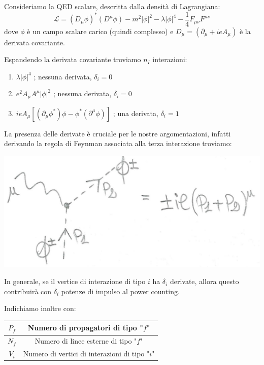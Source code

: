 \documentclass[../main.tex]{subfiles}
\begin{document}
\begin{example}
    Consideriamo la QED scalare, descritta dalla densità di Lagrangiana:
    \[
    \mathscr{L} = (D_\mu\phi)^*(D^\mu\phi)-m^2|\phi|^2-\lambda|\phi|^4-\frac{1}{4}F_{\mu\nu}F^{\mu\nu}
    \]
    dove $\phi$ è un campo scalare carico (quindi complesso) e $D_\mu = (\partial_\mu+ieA_\mu)$ è la derivata covariante.

    Espandendo la derivata covariante troviamo $n_I$ interazioni:
    \begin{enumerate}
        \item $\lambda|\phi|^4$ ; nessuna derivata, $\delta_i=0$
        \item $e^2 A_\mu A^\mu |\phi|^2$ ; nessuna derivata, $\delta_i=0$
        \item $ieA_\mu[(\partial_\mu\phi^*)\phi - \phi^*(\partial^\mu\phi)]$ ; una derivata, $\delta_i=1$
    \end{enumerate}
    La presenza delle derivate è cruciale per le nostre argomentazioni, infatti derivando la regola di Feynman associata alla terza interazione troviamo:

    \includegraphics[]{images/vertex_feyn.jpg}

    In generale, se il vertice di interazione di tipo $i$ ha $\delta_i$ derivate, allora questo contribuirà con $\delta_i$ potenze  di impulso al power counting.
    
\end{example}

Indichiamo inoltre con:

\begin{tabular}{c|c|}
            \hline
             $P_f$           &  Numero di propagatori di tipo "$f$"\cellcolor{gray!25}  \\ \hline
             $N_f$           &  Numero di linee esterne di tipo "$f$"\cellcolor{gray!25}   \\  \hline
             $V_i$           &  Numero di vertici di interazioni di tipo "$i$"\cellcolor{gray!25}   \\ \hline
\end{tabular}
\end{document}
